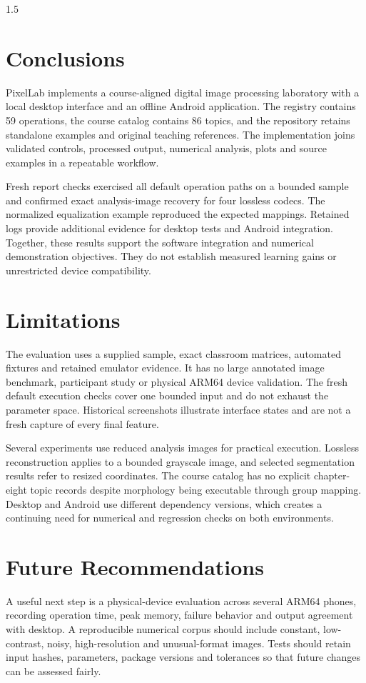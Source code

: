 \begin{spacing}{1.5}
\section{Conclusions}
PixelLab implements a course-aligned digital image processing laboratory with a local desktop interface and an offline Android application. The registry contains 59 operations, the course catalog contains 86 topics, and the repository retains standalone examples and original teaching references. The implementation joins validated controls, processed output, numerical analysis, plots and source examples in a repeatable workflow.

Fresh report checks exercised all default operation paths on a bounded sample and confirmed exact analysis-image recovery for four lossless codecs. The normalized equalization example reproduced the expected mappings. Retained logs provide additional evidence for desktop tests and Android integration. Together, these results support the software integration and numerical demonstration objectives. They do not establish measured learning gains or unrestricted device compatibility.

\section{Limitations}
The evaluation uses a supplied sample, exact classroom matrices, automated fixtures and retained emulator evidence. It has no large annotated image benchmark, participant study or physical ARM64 device validation. The fresh default execution checks cover one bounded input and do not exhaust the parameter space. Historical screenshots illustrate interface states and are not a fresh capture of every final feature.

Several experiments use reduced analysis images for practical execution. Lossless reconstruction applies to a bounded grayscale image, and selected segmentation results refer to resized coordinates. The course catalog has no explicit chapter-eight topic records despite morphology being executable through group mapping. Desktop and Android use different dependency versions, which creates a continuing need for numerical and regression checks on both environments.

\section{Future Recommendations}
A useful next step is a physical-device evaluation across several ARM64 phones, recording operation time, peak memory, failure behavior and output agreement with desktop. A reproducible numerical corpus should include constant, low-contrast, noisy, high-resolution and unusual-format images. Tests should retain input hashes, parameters, package versions and tolerances so that future changes can be assessed fairly.


\end{spacing}
